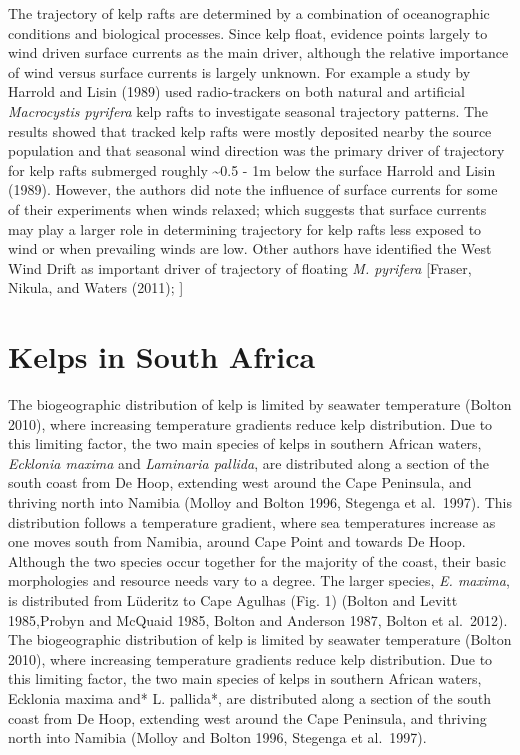 \documentclass[
]{article}
\begin{document}
The trajectory of kelp rafts are determined by a combination of
oceanographic conditions and biological processes. Since kelp float,
evidence points largely to wind driven surface currents as the main
driver, although the relative importance of wind versus surface currents
is largely unknown. For example a study by Harrold and Lisin (1989) used
radio-trackers on both natural and artificial \emph{Macrocystis
pyrifera} kelp rafts to investigate seasonal trajectory patterns. The
results showed that tracked kelp rafts were mostly deposited nearby the
source population and that seasonal wind direction was the primary
driver of trajectory for kelp rafts submerged roughly \textasciitilde0.5
- 1m below the surface Harrold and Lisin (1989). However, the authors
did note the influence of surface currents for some of their experiments
when winds relaxed; which suggests that surface currents may play a
larger role in determining trajectory for kelp rafts less exposed to
wind or when prevailing winds are low. Other authors have identified the
West Wind Drift as important driver of trajectory of floating \emph{M.
pyrifera} {[}Fraser, Nikula, and Waters (2011); {]}

\hypertarget{kelps-in-south-africa}{%
\section{Kelps in South Africa}\label{kelps-in-south-africa}}

The biogeographic distribution of kelp is limited by seawater
temperature (Bolton 2010), where increasing temperature gradients reduce
kelp distribution. Due to this limiting factor, the two main species of
kelps in southern African waters, \emph{Ecklonia maxima} and
\emph{Laminaria pallida}, are distributed along a section of the south
coast from De Hoop, extending west around the Cape Peninsula, and
thriving north into Namibia (Molloy and Bolton 1996, Stegenga et
al.~1997). This distribution follows a temperature gradient, where sea
temperatures increase as one moves south from Namibia, around Cape Point
and towards De Hoop. Although the two species occur together for the
majority of the coast, their basic morphologies and resource needs vary
to a degree. The larger species, \emph{E. maxima}, is distributed from
Lüderitz to Cape Agulhas (Fig. 1) (Bolton and Levitt 1985,Probyn and
McQuaid 1985, Bolton and Anderson 1987, Bolton et al.~2012). The
biogeographic distribution of kelp is limited by seawater temperature
(Bolton 2010), where increasing temperature gradients reduce kelp
distribution. Due to this limiting factor, the two main species of kelps
in southern African waters, Ecklonia maxima and* L. pallida*, are
distributed along a section of the south coast from De Hoop, extending
west around the Cape Peninsula, and thriving north into Namibia (Molloy
and Bolton 1996, Stegenga et al.~1997).
\end{document}
